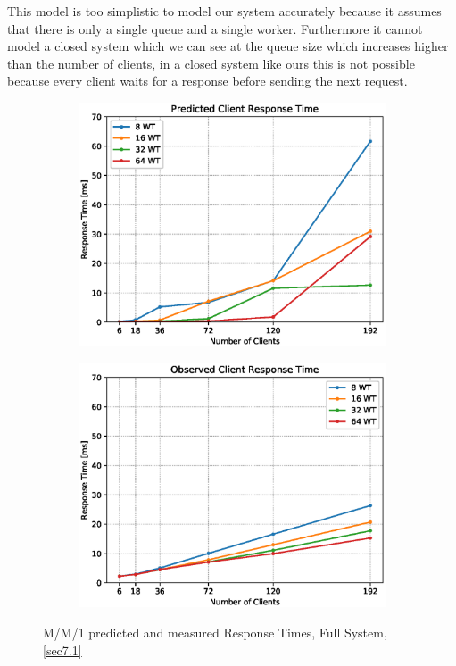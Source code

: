 \documentclass[11pt,a4paper]{article}
\begin{document}
This model is too simplistic to model our system accurately because it assumes that there is only a single queue and a single worker. Furthermore it cannot model a closed system which we can see at the queue size which increases higher than the number of clients, in a closed system like ours this is not possible because every client waits for a response before sending the next request.

\begin{figure}
    \begin{subfigure}{.5\textwidth}
        \includegraphics[width=1\linewidth]{plots/7_MM1_ResponseTimePredicted.eps}
    \end{subfigure}
    \begin{subfigure}{.5\textwidth}
        \includegraphics[width=1\linewidth]{plots/7_MM1_ResponseTimeObserved.eps}
    \end{subfigure}
    \caption{M/M/1 predicted and measured Response Times, Full System, \autoref{sec7.1}}
    \label{fig:mm1-RT}
\end{figure}
\end{document}
